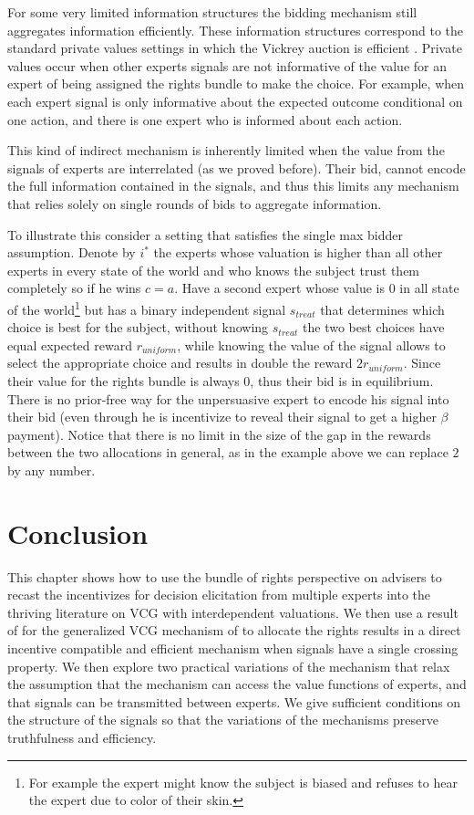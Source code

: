  For some very limited information structures the bidding mechanism still aggregates information efficiently. 
 These information structures correspond to the standard private values settings in which the Vickrey auction is efficient \cite{vickrey1961}.
 Private values occur when other experts signals are not informative of the value for an expert of being assigned the rights bundle to make the choice.
 For example, when each expert signal is only informative about the expected outcome conditional on one action, and  there is one expert who is informed about each action.
 
 
 This kind of indirect mechanism is inherently limited when the value from the signals of experts are interrelated (as we proved before). Their bid, cannot encode the full information contained in the signals, and thus this limits any mechanism that relies solely on single rounds of bids to aggregate information.
 
 To illustrate this consider a setting that satisfies the single max bidder assumption. Denote by $i^*$ the experts whose valuation is higher than all other experts in every state of the world and who knows the subject trust them completely so if he wins $c=a$. Have a second expert whose value is $0$ in all state of the world\footnote{For example the expert might know the subject is biased and refuses to hear the expert due to color of their skin.} but has a binary independent signal $s_{treat}$ that determines which choice is best for the subject, without knowing $s_{treat}$ the two best choices have equal expected reward $r_{uniform}$, while knowing the value of the signal allows to select the appropriate choice and results in double the reward $2r_{uniform}$.
 Since their value for the rights bundle is always 0, thus their bid is in equilibrium. 
 There is no prior-free way for the unpersuasive expert to encode his signal into their bid (even through he is incentivize to reveal their signal to get a higher $\beta$ payment). 
 Notice that there is no limit in the size of the gap in the rewards between the two allocations in general, as in the example above we can replace $2$ by any number.
 
 

\section{Conclusion}

This chapter shows how to use the bundle of rights perspective on advisers to recast the incentivizes for decision elicitation from multiple experts into the thriving literature on VCG with interdependent valuations.
We then use a result of \cite{roughgarden2016optimal} for the generalized VCG mechanism of \cite{maskin1992auctions} to allocate the rights results in a direct incentive compatible and efficient mechanism when signals have a single crossing property.
We then explore two practical variations of the mechanism that relax the assumption that the mechanism can access the value functions of experts, and that signals can be transmitted between experts. We give sufficient conditions on the structure of the signals so that the variations of the mechanisms preserve truthfulness and efficiency.
